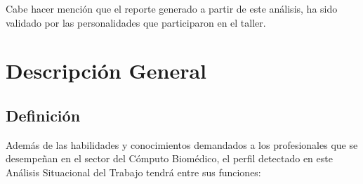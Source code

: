 Cabe hacer mención que el reporte generado a partir de este análisis, ha sido validado por las personalidades que participaron en el taller.


\section{Descripción General}
\label{sec:desc_general}

\subsection{Definición}
\label{subsec:definicion}

Además de las habilidades y conocimientos demandados a los profesionales que se desempeñan en el sector del Cómputo Biomédico, el perfil detectado en este Análisis Situacional del Trabajo tendrá entre sus funciones:


